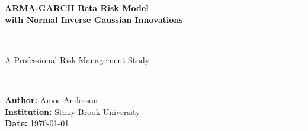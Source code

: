 \documentclass[12pt, a4paper]{article}
\begin{document}

\begin{titlepage}
\centering
\vspace*{1cm}


{\LARGE\bfseries\color{darkblue}
  ARMA-GARCH Beta Risk Model\\[0.4cm]
  with Normal Inverse Gaussian Innovations
}\\[1cm]

\rule{\textwidth}{1pt}\\[0.4cm]
{\large A Professional Risk Management Study}\\[0.4cm]
\rule{\textwidth}{1pt}\\[1.5cm]

{\large
  \textbf{Author:} Amos Anderson\\[0.3cm]
  \textbf{Institution:} Stony Brook University\\[0.3cm]
  \textbf{Date:} \today
}\\[2cm]

\begin{abstract}
\noindent
We construct, parameterise, and validate a professional-grade 
next-day equity risk model based on ARMA(1,1)-GARCH(1,1) filtering 
combined with Normal Inverse Gaussian (NIG) heavy-tailed innovation 
modelling. The model is assessed across five structurally distinct 
asset classes: the S\&P 500 index (\texttt{\^{}GSPC}), Apple Inc.\ 
(\texttt{AAPL}), the SPDR Gold ETF (\texttt{GLD}), the iShares TIPS 
ETF (\texttt{TIP}), and the EUR/USD exchange rate 
(\texttt{EURUSD=X}). Using a 250-period rolling estimation window 
over a 1,000-period assessment horizon (November 2021 -- December 
2025), we compute daily Value at Risk (VaR) and Conditional Value at 
Risk (CVaR) forecasts and subject them to four independent 
statistical tests: binomial backtesting, Kolmogorov-Smirnov, 
Anderson-Darling, and the Christoffersen independence test. The model 
passes binomial backtesting at both 95\% and 99\% confidence levels 
on all five asset classes simultaneously. NIG achieves 44--79\% lower 
Kolmogorov-Smirnov statistics relative to the Gaussian baseline 
across all assets, confirming the necessity of heavy-tailed modelling 
for accurate risk quantification.
\end{abstract}

\end{titlepage}
\end{document}
